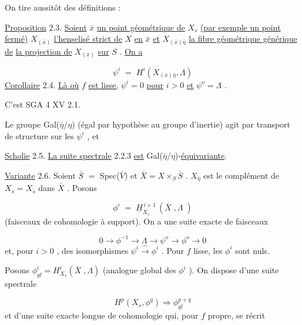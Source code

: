 
On tire aussitôt des définitions :

\underline{Proposition} 2.3.  \underline{Soient}  $\bar{x}$  \underline{un point géométrique de}  $X_s$  \underline{(par exemple un point fermé)} $X_{(\bar{x})}$  \underline{l'henselisé strict de}  $X$  \underline{en}  $\bar{x}$  \underline{et}  $X_{(\bar{x})\bar{\eta}}$   \underline{la fibre géométrique générique de} \underline{la projection de}  $X_{(\bar{x})}$  \underline{sur}  $S$ .  \underline{On a}

\begin{equation*}
\psi^i \;=\; H^i(X_{(\bar{x})\bar{\eta}},\Lambda)
\end{equation*}
\underline{Corollaire} 2.4.  \underline{Là où}  $f$  \underline{est lisse,}  $\psi^i = 0$  \underline{pour}  $i > 0$  \underline{et}  $\psi^{o} = \Lambda$ .

C'est SGA 4 XV 2.1.

Le groupe  Gal($\bar{\eta}/\eta$)  (égal par hypothèse au groupe d'inertie) agit par transport de structure sur les   $\psi^i$ , et

\underline{Scholie} 2.5.  \underline{La suite spectrale} 2.2.3 \underline{est}  Gal($\bar{\eta}/\eta$)-\underline{équivariante}.

\underline{Variante} 2.6.  Soient  $\bar{S}$ $=$ Spec($\bar{V}$)  et  $\bar{X} = X \times_S \bar{S}$ .  $X_{\bar{\eta}}$  est le complément de $X_s = X_{\bar{s}}$  dans  $\bar{X}$ . Posons

\begin{equation*}
\phi^i \;=\; \underline{H}^{\,i+1}_{X_s}\,(\bar{X}\;,\Lambda\;)
\end{equation*}
(faisceaux de cohomologie à support). On a une suite exacte de faisceaux

\begin{equation*}
0 \longrightarrow \phi^{-1} \longrightarrow \Lambda \longrightarrow \psi^{o} \longrightarrow \phi^{o} \longrightarrow 0
\end{equation*}
et, pour  $i > 0$ , des isomorphismes  $\psi^i \xrightarrow{\ \sim\ } \phi^i$ . Pour  $f$  lisse, les  $\phi^i$  sont nuls.

Posons  $\phi^i_{gl} = H^i_{X_s}(\bar{X}\;,\Lambda)$  (analogue global des  $\phi^i$ ). On dispose d'une suite spectrale

\begin{equation*}\tag{2.6.1}
H^p(X_s,\phi^q) \Longrightarrow \phi^{p+q}_{gl}
\end{equation*}
et d'une suite exacte longue de cohomologie qui, pour  $f$  propre, se récrit

